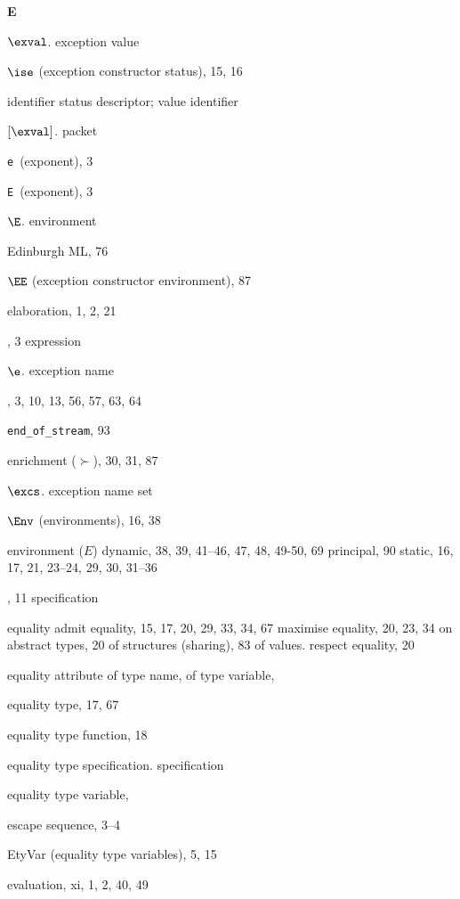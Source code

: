 \begin{theindex}
\indexspace
\parbox{65mm}{\hfil{\large\bf E}\hfil}
\indexspace
\item $\exval$. \see exception value
\item $\ise$ (exception constructor status), 15, 16
\item \seealso identifier status descriptor; value identifier
\item $[\exval]$. \see packet
\item \verb+e+\ (exponent), 3
\item \verb+E+\ (exponent), 3
\item $\E$. \see environment
\item Edinburgh ML, 76
\item $\EE$ (exception constructor environment), 87
\item elaboration, 1, 2, 21
\item \ELSE, 3
\subitem \seealso expression
\item $\e$. \see exception name
\item \END, 3, 10, 13, 56, 57, 63, 64
\item \verb+end_of_stream+, 93
\item enrichment ($\succ$), 30, 31, 87
\item $\excs$. \see exception name set
\item $\Env$ (environments), 16, 38
\item environment ($E$)
\subitem dynamic, 38, 39, 41--46, 47, 48, 49-50, 69
\subitem principal, 90
\subitem static, 16, 17, 21, 23--24, 29, 30, 31--36
\item \EQTYPE, 11
\subitem \seealso specification
\item equality
\subitem admit equality, 15, 17, 20, 29, 33, 34, 67
\subitem maximise equality, 20, 23, 34
\subitem on abstract types, 20
\subitem of structures (sharing), 83
\subitem of values. \see \boxml{=}
\subitem respect equality, 20
\item equality attribute
\subitem of type name, \eqtynamerefs
\subitem of type variable, \eqtyvarrefs
\item equality type, 17, 67
\item equality type function, 18
\item equality type specification. \see specification
\item equality type variable, \eqtyvarrefs
\item escape sequence, 3--4
\item EtyVar (equality type variables), 5, 15
\item evaluation, xi, 1, 2, 40, 49

\end{theindex}
